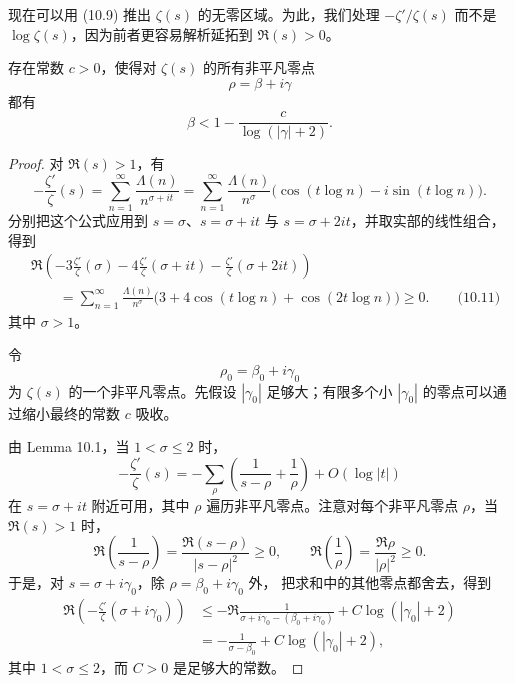 现在可以用 (10.9) 推出 $\zeta(s)$ 的无零区域。为此，我们处理
$-\zeta'/\zeta(s)$ 而不是 $\log\zeta(s)$，因为前者更容易解析延拓到
$\Re(s)>0$。

\begin{theorem}[原文 Theorem 10.5]
	存在常数 $c>0$，使得对 $\zeta(s)$ 的所有非平凡零点
	\[
		\rho=\beta+i\gamma
	\]
	都有
	\[
		\beta
		<
		1-\frac{c}{\log(|\gamma|+2)}.
	\]
\end{theorem}

\begin{proof}
	对 $\Re(s)>1$，有
	\[
		-\frac{\zeta'}{\zeta}(s)
		=
		\sum_{n=1}^{\infty}\frac{\Lambda(n)}{n^{\sigma+it}}
		=
		\sum_{n=1}^{\infty}
		\frac{\Lambda(n)}{n^\sigma}
		\bigl(\cos(t\log n)-i\sin(t\log n)\bigr).
	\]
	分别把这个公式应用到 $s=\sigma$、$s=\sigma+it$ 与
	$s=\sigma+2it$，并取实部的线性组合，得到
	\begin{equation*}
	\begin{aligned}
		&
		\Re\left(
			-3\frac{\zeta'}{\zeta}(\sigma)
			-4\frac{\zeta'}{\zeta}(\sigma+it)
			-\frac{\zeta'}{\zeta}(\sigma+2it)
		\right) \\
		&\qquad=
		\sum_{n=1}^{\infty}
		\frac{\Lambda(n)}{n^\sigma}
		\bigl(3+4\cos(t\log n)+\cos(2t\log n)\bigr)
		\geq 0.
		\qquad\text{(10.11)}
	\end{aligned}
	\end{equation*}
	其中 $\sigma>1$。

	令
	\[
		\rho_0=\beta_0+i\gamma_0
	\]
	为 $\zeta(s)$ 的一个非平凡零点。先假设 $|\gamma_0|$ 足够大；有限多个小
	$|\gamma_0|$ 的零点可以通过缩小最终的常数 $c$ 吸收。

	由 Lemma 10.1，当 $1<\sigma\leq2$ 时，
	\[
		-\frac{\zeta'}{\zeta}(s)
		=
		-\sum_\rho
		\left(
			\frac1{s-\rho}
			+\frac1{\rho}
		\right)
		+
		O(\log |t|)
	\]
	在 $s=\sigma+it$ 附近可用，其中 $\rho$ 遍历非平凡零点。注意对每个非平凡零点
	$\rho$，当 $\Re(s)>1$ 时，
	\[
		\Re\left(\frac1{s-\rho}\right)
		=
		\frac{\Re(s-\rho)}{|s-\rho|^2}
		\geq 0,
		\qquad
		\Re\left(\frac1{\rho}\right)
		=
		\frac{\Re\rho}{|\rho|^2}
		\geq 0.
	\]
	于是，对 $s=\sigma+i\gamma_0$，除 $\rho=\beta_0+i\gamma_0$ 外，
	把求和中的其他零点都舍去，得到
	\[
	\begin{aligned}
		\Re\left(
			-\frac{\zeta'}{\zeta}(\sigma+i\gamma_0)
		\right)
		&\leq
		-\Re\frac{1}{\sigma+i\gamma_0-(\beta_0+i\gamma_0)}
		+
		C\log(|\gamma_0|+2) \\
		&=
		-\frac1{\sigma-\beta_0}
		+
		C\log(|\gamma_0|+2),
	\end{aligned}
	\]
	其中 $1<\sigma\leq2$，而 $C>0$ 是足够大的常数。


\end{proof}
